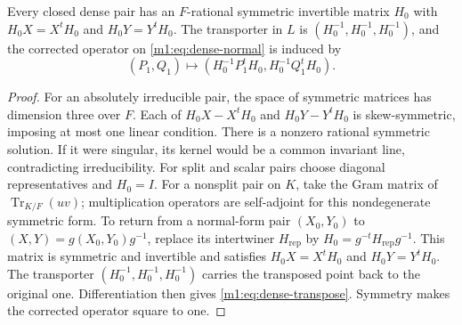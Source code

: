 \begin{lemma}\label{m1:lem:dense-transpose}
Every closed dense pair has an $F$-rational symmetric invertible matrix
$H_0$ with $H_0X=X^tH_0$ and $H_0Y=Y^tH_0$. The transporter in $L$ is
$(H_0^{-1},H_0^{-1},H_0^{-1})$, and the corrected operator on
\eqref{m1:eq:dense-normal} is induced by
\begin{equation}\label{m1:eq:dense-transpose}
 (P_1,Q_1)\longmapsto(H_0^{-1}P_1^tH_0,H_0^{-1}Q_1^tH_0).
\end{equation}
\end{lemma}
\begin{proof}
For an absolutely irreducible pair, the space of symmetric matrices has
dimension three over $F$. Each of $H_0X-X^tH_0$ and $H_0Y-Y^tH_0$ is
skew-symmetric, imposing at most one linear condition. There is a
nonzero rational symmetric solution. If it were singular, its kernel
would be a common invariant line, contradicting irreducibility. For
split and scalar pairs choose diagonal representatives and $H_0=I$.
For a nonsplit pair on $K$, take the Gram matrix of
$\operatorname{Tr}_{K/F}(uv)$; multiplication operators are self-adjoint
for this nondegenerate symmetric form. To return from a normal-form pair
$(X_0,Y_0)$ to $(X,Y)=g(X_0,Y_0)g^{-1}$, replace its intertwiner
$H_{\mathrm{rep}}$ by $H_0=g^{-t}H_{\mathrm{rep}}g^{-1}$.
This matrix is symmetric and invertible and satisfies
$H_0X=X^tH_0$ and $H_0Y=Y^tH_0$.
The transporter $(H_0^{-1},H_0^{-1},H_0^{-1})$ carries the transposed point back to the original one. Differentiation then gives \eqref{m1:eq:dense-transpose}.
Symmetry makes the corrected operator square to one.
\end{proof}

